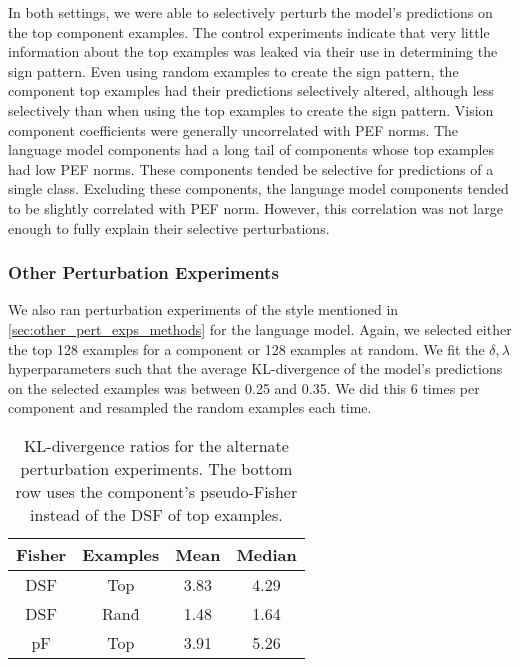 \documentclass[dvipsnames]{article}
\begin{document}
In both settings, we were able to selectively perturb the model's predictions on the top component examples.
The control experiments indicate that very little information about the top examples was leaked via their use in determining the sign pattern.
Even using random examples to create the sign pattern, the component top examples had their predictions selectively altered, although less selectively than when using the top examples to create the sign pattern.
Vision component coefficients were generally uncorrelated with PEF norms.
The language model components had a long tail of components whose top examples had low PEF norms.
These components tended be selective for predictions of a single class.
Excluding these components, the language model components tended to be slightly correlated with PEF norm.
However, this correlation was not large enough to fully explain their selective perturbations.

\subsubsection{Other Perturbation Experiments}
We also ran perturbation experiments of the style mentioned in \cref{sec:other_pert_exps_methods} for the language model.
Again, we selected either the top 128 examples for a component or 128 examples at random.
We fit the $\delta,\lambda$ hyperparameters such that the average KL-divergence of the model's predictions on the selected examples was between 0.25 and 0.35.
We did this 6 times per component and resampled the random examples each time.

\begin{table}[t]
\caption{%
KL-divergence ratios for the alternate perturbation experiments. The bottom row uses the component's pseudo-Fisher instead of the DSF of top examples.
}
\label{table:ex_dsf_ratios}
\vskip 0.15in
\begin{center}
\begin{small}
\begin{sc}
\begin{tabular}{cccc}
\toprule
Fisher & Examples & Mean & Median \\
\midrule
DSF & Top & 3.83 & 4.29 \\
DSF & Rand\. & 1.48 & 1.64 \\
pF & Top & 3.91 & 5.26 \\
\bottomrule
\end{tabular}
\end{sc}
\end{small}
\end{center}
\vskip -0.1in
\end{table}
\end{document}
